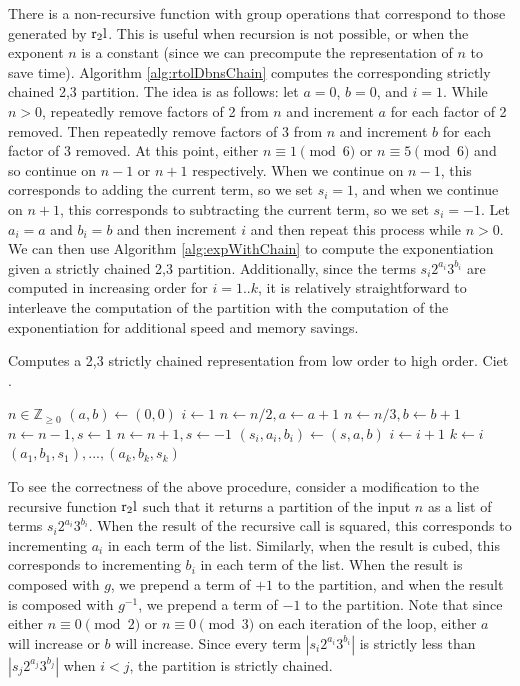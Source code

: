 \documentclass{ucalgthes1}
\theoremstyle{definition}
\newcommand{\ZZgez}{\mathbb{Z}_{\ge 0}}
\begin{document}
There is a non-recursive function with group operations that correspond to those generated by $\textrm{r}_2\textrm{l}$. This is useful when recursion is not possible, or when the exponent $n$ is a constant (since we can precompute the representation of $n$ to save time). Algorithm \ref{alg:rtolDbnsChain} computes the corresponding strictly chained 2,3 partition.  The idea is as follows: let $a = 0$, $b=0$, and $i=1$.  While $n > 0$, repeatedly remove factors of 2 from $n$ and increment $a$ for each factor of 2 removed. Then repeatedly remove factors of 3 from $n$ and increment $b$ for each factor of 3 removed. At this point, either $n \equiv 1 \pmod 6$ or $n \equiv 5 \pmod 6$ and so continue on $n-1$ or $n+1$ respectively.  When we continue on $n-1$, this corresponds to adding the current term, so we set $s_i=1$, and when we continue on $n+1$, this corresponds to subtracting the current term, so we set $s_i=-1$. Let $a_i = a$ and $b_i = b$ and then increment $i$ and then repeat this process while $n > 0$.  We can then use Algorithm \ref{alg:expWithChain} to compute the exponentiation given a strictly chained 2,3 partition. Additionally, since the terms $s_i2^{a_i}3^{b_i}$ are computed in increasing order for $i=1..k$, it is relatively straightforward to interleave the computation of the partition with the computation of the exponentiation for additional speed and memory savings.

\begin{algorithm}[h]
\caption{Computes a 2,3 strictly chained representation from low order to high order. Ciet \cite{Ciet2006}.}
\label{alg:rtolDbnsChain}
\begin{algorithmic}[1]
\REQUIRE $n \in \ZZgez$
\STATE $(a, b) \gets (0, 0)$
\STATE $i \gets 1$
		\STATE $n \gets n / 2, a \gets a + 1$
	\ENDWHILE
		\STATE $n \gets n / 3, b \gets b + 1$
	\ENDWHILE
		\STATE $n \gets n - 1, s \gets 1$
		\STATE $n \gets n + 1, s \gets -1$
	\ENDIF
	\STATE $(s_i, a_i, b_i) \gets (s, a, b)$
	\STATE $i \gets i + 1$
\ENDWHILE
\STATE $k \gets i$
\RETURN $(a_1, b_1, s_1), ..., (a_k, b_k, s_k)$
\end{algorithmic}
\end{algorithm}

To see the correctness of the above procedure, consider a modification to the recursive function $\textrm{r}_2\textrm{l}$ such that it returns a partition of the input $n$ as a list of terms $s_i2^{a_i}3^{b_i}$. When the result of the recursive call is squared, this corresponds to incrementing $a_i$ in each term of the list.  Similarly, when the result is cubed, this corresponds to incrementing $b_i$ in each term of the list. When the result is composed with $g$, we prepend a term of $+1$ to the partition, and when the result is composed with $g^{-1}$, we prepend a term of $-1$ to the partition. Note that since either $n \equiv 0 \pmod 2$ or $n \equiv 0 \pmod 3$ on each iteration of the loop, either $a$ will increase or $b$ will increase. Since every term $|s_i2^{a_i}3^{b_i}|$ is strictly less than $|s_j2^{a_j}3^{b_j}|$ when $i < j$, the partition is strictly chained.
\end{document}
